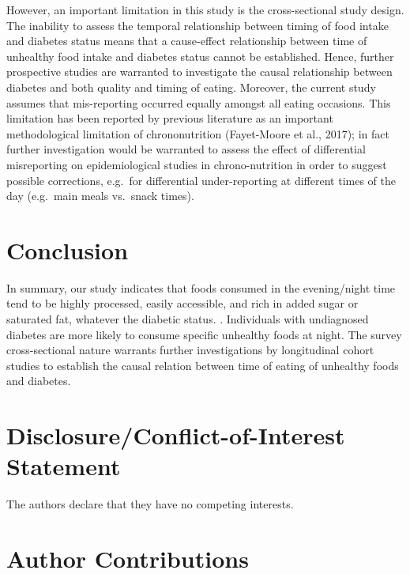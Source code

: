 \documentclass[utf8]{frontiersSCNS}
\begin{document}
However, an important limitation in this study is the cross-sectional
study design. The inability to assess the temporal relationship between
timing of food intake and diabetes status means that a cause-effect
relationship between time of unhealthy food intake and diabetes status
cannot be established. Hence, further prospective studies are warranted
to investigate the causal relationship between diabetes and both quality
and timing of eating. Moreover, the current study assumes that
mis-reporting occurred equally amongst all eating occasions. This
limitation has been reported by previous literature as an important
methodological limitation of chrononutrition (Fayet-Moore et al., 2017);
in fact further investigation would be warranted to assess the effect of
differential misreporting on epidemiological studies in chrono-nutrition
in order to suggest possible corrections, e.g.~for differential
under-reporting at different times of the day (e.g.~main meals vs.~snack
times).

\hypertarget{conclusion}{%
\section*{Conclusion}\label{conclusion}}

In summary, our study indicates that foods consumed in the evening/night
time tend to be highly processed, easily accessible, and rich in added
sugar or saturated fat, whatever the diabetic status. . Individuals with
undiagnosed diabetes are more likely to consume specific unhealthy foods
at night. The survey cross-sectional nature warrants further
investigations by longitudinal cohort studies to establish the causal
relation between time of eating of unhealthy foods and diabetes.

\hypertarget{disclosureconflict-of-interest-statement}{%
\section*{Disclosure/Conflict-of-Interest
Statement}\label{disclosureconflict-of-interest-statement}}

The authors declare that they have no competing interests.

\hypertarget{author-contributions}{%
\section*{Author Contributions}\label{author-contributions}}
\end{document}
